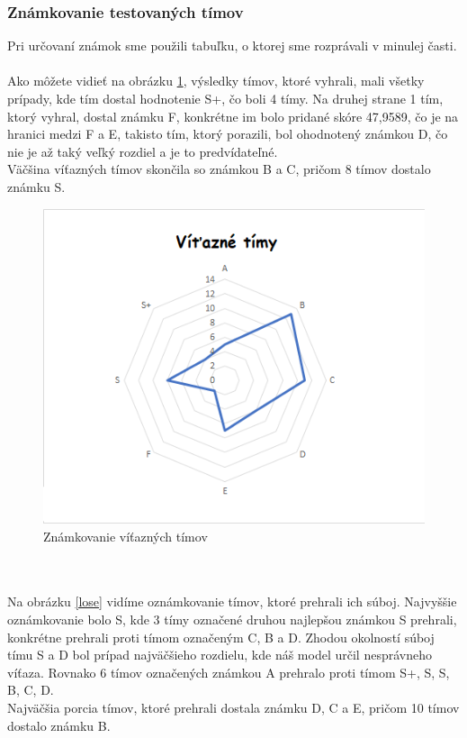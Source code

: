 \subsubsection{Známkovanie testovaných tímov}
Pri určovaní známok sme použili tabuľku, o ktorej sme rozprávali v minulej časti. 
\\ \\
Ako môžete vidieť na obrázku \ref{win}, výsledky tímov, ktoré vyhrali, mali všetky prípady, kde tím dostal hodnotenie S+, čo boli 4 tímy. Na druhej strane 1 tím, ktorý vyhral, dostal známku F, konkrétne im bolo pridané skóre 47,9589, čo je na hranici medzi F a E, takisto tím, ktorý porazili, bol ohodnotený známkou D, čo nie je až taký veľký rozdiel a je to predvídateľné.
\\
Väčšina víťazných tímov skončila so známkou B a C, pričom 8 tímov dostalo známku S.
\begin{figure}[h!]
	
	\includegraphics[width=.9\textwidth]{figures/win}
	\centering
	\caption{ Známkovanie víťazných tímov \label{win}}
	
\end{figure}
\\ \\
Na obrázku \ref{lose} vidíme oznámkovanie tímov, ktoré prehrali ich súboj. Najvyššie oznámkovanie bolo S, kde 3 tímy označené druhou najlepšou známkou S prehrali, konkrétne prehrali proti tímom označeným C, B a D. Zhodou okolností súboj tímu S a D bol prípad najväčšieho rozdielu, kde náš model určil nesprávneho víťaza. Rovnako 6 tímov označených známkou A prehralo proti tímom S+, S, S, B, C, D.
\\ 
Najväčšia porcia tímov, ktoré prehrali dostala známku D, C a E, pričom 10 tímov dostalo známku B.

